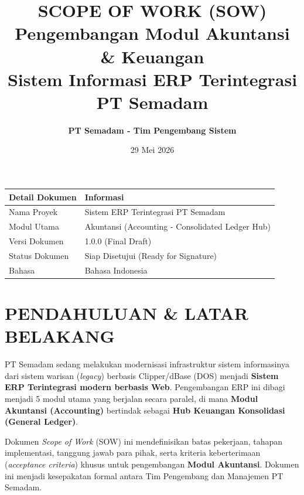 \documentclass[11pt,a4paper]{article}
\title{
    \vspace{-1.5cm}
    \color{primarycolor}\textbf{\Huge SCOPE OF WORK (SOW)}\\
    \vspace{0.3cm}
    \color{secondarycolor}\Large\textbf{Pengembangan Modul Akuntansi \& Keuangan}\\
    \vspace{0.2cm}
    \large\textbf{Sistem Informasi ERP Terintegrasi PT Semadam}
}
\author{\textbf{PT Semadam - Tim Pengembang Sistem}}
\date{29 Mei 2026}
\begin{document}
\maketitle

\thispagestyle{empty}
\begin{center}
    \vspace{1.5cm}
    \begin{tabular}{ll}
        \toprule
        \textbf{Detail Dokumen} & \textbf{Informasi} \\
        \midrule
        Nama Proyek & Sistem ERP Terintegrasi PT Semadam \\
        Modul Utama & Akuntansi (Accounting - Consolidated Ledger Hub) \\
        Versi Dokumen & 1.0.0 (Final Draft) \\
        Status Dokumen & Siap Disetujui (Ready for Signature) \\
        Bahasa & Bahasa Indonesia \\
        \bottomrule
    \end{tabular}
\end{center}

\newpage
\tableofcontents
\newpage

\section{PENDAHULUAN \& LATAR BELAKANG}
PT Semadam sedang melakukan modernisasi infrastruktur sistem informasinya dari sistem warisan (\textit{legacy}) berbasis Clipper/dBase (DOS) menjadi \textbf{Sistem ERP Terintegrasi modern berbasis Web}. Pengembangan ERP ini dibagi menjadi 5 modul utama yang berjalan secara paralel, di mana \textbf{Modul Akuntansi (Accounting)} bertindak sebagai \textbf{Hub Keuangan Konsolidasi (General Ledger)}.

Dokumen \textit{Scope of Work} (SOW) ini mendefinisikan batas pekerjaan, tahapan implementasi, tanggung jawab para pihak, serta kriteria keberterimaan (\textit{acceptance criteria}) khusus untuk pengembangan \textbf{Modul Akuntansi}. Dokumen ini menjadi kesepakatan formal antara Tim Pengembang dan Manajemen PT Semadam.

\end{document}
